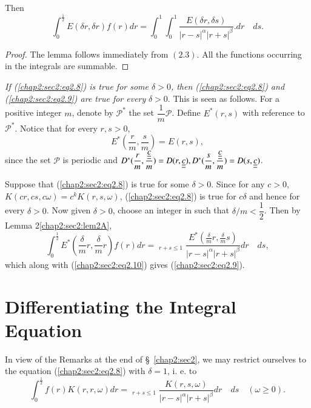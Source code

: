 Then\pageoriginale
\begin{equation*}
\int_{0}^{\frac{1}{2}} E(\delta r, \delta r) f(r) dr = \int_{0}^{1} \int_{0}^{1} \frac{E(\delta r, \delta s)}{|r - s|^{\alpha} |r+s|^{\beta}}. dr \quad ds.\tag{2.9}\label{chap2:sec2:eq2.9}
\end{equation*}

\begin{proof}
The lemma follows immediately from $(2.3)$. All the functions occurring in the integrals are summable.
\end{proof}

\begin{remark*}
{\em If (\ref{chap2:sec2:eq2.8}) is true for some $\delta > 0$, then (\ref{chap2:sec2:eq2.8}) and (\ref{chap2:sec2:eq2.9}) are true for every} $\delta > 0$. This is seen as follows. For a positive integer $m$, denote by $\mathscr{P}^{*}$ the set $\dfrac{1}{m} \mathscr{P}$. Define $E^{*}(r, s)$ with reference to $\mathscr{P}^{*}$. Notice that for every $r, s > 0$,
\begin{equation*}
E^{*} \left(\frac{r}{m}, \frac{s}{m}\right) = E(r, s),\tag{2.10}\label{chap2:sec2:eq2.10}
\end{equation*}
since the set $\mathscr{P}$ is periodic and $D^{*} (\dfrac{r}{m},
\dfrac{\uub{c}}{m}) = D(r, \uub{c}), D^{*} (\dfrac{s}{m},
\dfrac{\uub{c}}{m})\break = D(s, \uub{c})$. 
\end{remark*}

Suppose that (\ref{chap2:sec2:eq2.8}) is true for some $\delta > 0$. Since for any $c > 0$, $K(cr, cs, c\omega) = c^{k} K(r, s, \omega)$, (\ref{chap2:sec2:eq2.8}) is true for $c \delta$ and hence for every $\delta > 0$. Now given $\delta > 0$, choose an integer in such that $\delta / m < \dfrac{1}{2}$. Then by Lemma 2\ref{chap2:sec2:lem2A},
$$
\int_{0}^{\frac{1}{2}} E^{*} \left(\frac{\delta}{m} r, \frac{\delta}{m}r\right) f(r) dr = \mathop{\int_{0}^{1} \int_{0}^{1}}_{r+s \leq 1} \frac{E^{*} \left(\frac{\delta}{m} r, \frac{\delta}{m} s\right)}{|r-s|^{\alpha} |r+s|^{\beta}}dr \quad ds,
$$
which along with (\ref{chap2:sec2:eq2.10}) gives (\ref{chap2:sec2:eq2.9}).

\section{Differentiating the Integral Equation}\label{chap2:sec3}

\label{64}
In view of the Remarks at the end of \S\ \ref{chap2:sec2}, we may restrict ourselves to the equation (\ref{chap2:sec2:eq2.8}) with $\delta = 1$, i. e. to 
\begin{equation*}
\int_{0}^{\frac{1}{2}} f(r) K(r, r, \omega) dr = \mathop{\int_{0}^{1} \int_{0}^{1}}_{r+s \leq 1} \frac{K(r, s, \omega)}{|r-s|^{\alpha} |r+s|^{\beta}}dr \quad ds \quad (\omega \geq 0).\tag{3.1}\label{chap2:sec3:eq3.1}
\end{equation*}

